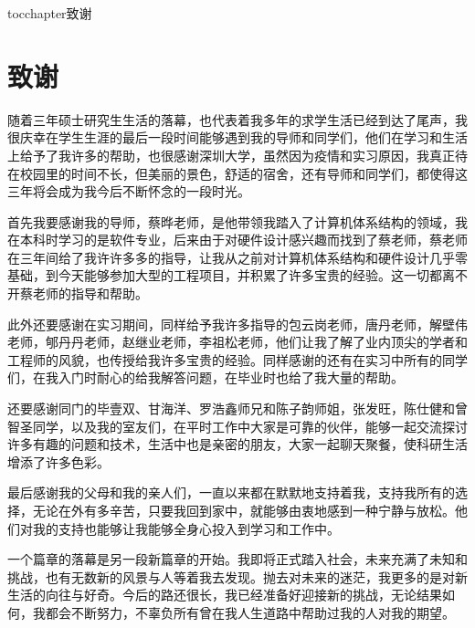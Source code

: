 
\newenvironment{theacknowledgements}{\wuhao\song}

\addcontentsline{toc}{chapter}{致谢}%
\chapter*{\centering\xiaosan\hei\bfseries 致\quad 谢}

\begin{theacknowledgements}
	
随着三年硕士研究生生活的落幕，也代表着我多年的求学生活已经到达了尾声，我很庆幸在学生生涯的最后一段时间能够遇到我的导师和同学们，他们在学习和生活上给予了我许多的帮助，也很感谢深圳大学，虽然因为疫情和实习原因，我真正待在校园里的时间不长，但美丽的景色，舒适的宿舍，还有导师和同学们，都使得这三年将会成为我今后不断怀念的一段时光。

首先我要感谢我的导师，蔡晔老师，是他带领我踏入了计算机体系结构的领域，我在本科时学习的是软件专业，后来由于对硬件设计感兴趣而找到了蔡老师，蔡老师在三年间给了我许许多多的指导，让我从之前对计算机体系结构和硬件设计几乎零基础，到今天能够参加大型的工程项目，并积累了许多宝贵的经验。这一切都离不开蔡老师的指导和帮助。

此外还要感谢在实习期间，同样给予我许多指导的包云岗老师，唐丹老师，解壁伟老师，郇丹丹老师，赵继业老师，李祖松老师，他们让我了解了业内顶尖的学者和工程师的风貌，也传授给我许多宝贵的经验。同样感谢的还有在实习中所有的同学们，在我入门时耐心的给我解答问题，在毕业时也给了我大量的帮助。

还要感谢同门的毕壹双、甘海洋、罗浩鑫师兄和陈子韵师姐，张发旺，陈仕健和曾智圣同学，以及我的室友们，在平时工作中大家是可靠的伙伴，能够一起交流探讨许多有趣的问题和技术，生活中也是亲密的朋友，大家一起聊天聚餐，使科研生活增添了许多色彩。

最后感谢我的父母和我的亲人们，一直以来都在默默地支持着我，支持我所有的选择，无论在外有多辛苦，只要我回到家中，就能够由衷地感到一种宁静与放松。他们对我的支持也能够让我能够全身心投入到学习和工作中。

一个篇章的落幕是另一段新篇章的开始。我即将正式踏入社会，未来充满了未知和挑战，也有无数新的风景与人等着我去发现。抛去对未来的迷茫，我更多的是对新生活的向往与好奇。今后的路还很长，我已经准备好迎接新的挑战，无论结果如何，我都会不断努力，不辜负所有曾在我人生道路中帮助过我的人对我的期望。

\end{theacknowledgements}





